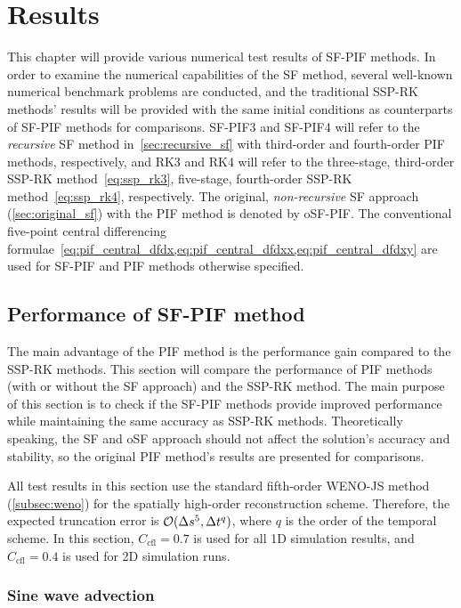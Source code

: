 \chapter{Results}\label{ch:results}

This chapter will provide various numerical test results of SF-PIF methods.
In order to examine the numerical capabilities of the SF method,
several well-known numerical benchmark problems are conducted,
and the traditional SSP-RK methods' results will be provided with the same initial conditions
as counterparts of SF-PIF methods for comparisons.
SF-PIF3 and SF-PIF4 will refer to the \textit{recursive} SF method in~\cref{sec:recursive_sf}
with third-order and fourth-order PIF methods, respectively,
and RK3 and RK4 will refer to the three-stage, third-order SSP-RK method~\cref{eq:ssp_rk3},
five-stage, fourth-order SSP-RK method~\cref{eq:ssp_rk4}, respectively.
The original, \textit{non-recursive} SF approach (\cref{sec:original_sf}) with the PIF method is denoted by oSF-PIF\@.
The conventional five-point central differencing formulae~\cref{eq:pif_central_dfdx,eq:pif_central_dfdxx,eq:pif_central_dfdxy}
are used for SF-PIF and PIF methods otherwise specified.

\section{Performance of SF-PIF method}\label{sec:result_performance}
The main advantage of the PIF method is the performance gain compared to the SSP-RK methods.
This section will compare the performance of PIF methods (with or without the SF approach)
and the SSP-RK method. The main purpose of this section is to check if the SF-PIF methods provide
improved performance while maintaining the same accuracy as SSP-RK methods.
Theoretically speaking, the SF and oSF approach should not affect the solution's accuracy and stability,
so the original PIF method's results are presented for comparisons.

All test results in this section use the standard fifth-order WENO-JS method (\cref{subsec:weno})
for the spatially high-order reconstruction scheme.
Therefore, the expected truncation error is \( \mathcal{O}(\Delta s^{5}, \Delta t^{q}) \),
where \( q \) is the order of the temporal scheme.
In this section, \( C_{\text{cfl}} = 0.7 \) is used for all 1D simulation results,
and \( C_{\text{cfl}} = 0.4 \) is used for 2D simulation runs.

\subsection{Sine wave advection}\label{subsec:sine_wave}

